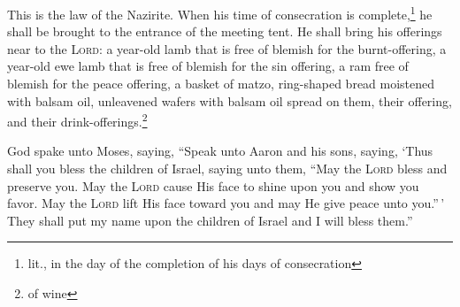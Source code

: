 \begin{enumerate*}[mode=unboxed]
     This is the law of the Nazirite. When his time of consecration is complete,\footnote{lit., in the day of the completion of his days of consecration} he shall be brought to the entrance of the meeting tent.%
     He shall bring his offerings near to the \textsc{Lord}: a year-old lamb that is free of blemish for the burnt-offering, a year-old ewe lamb that is free of blemish for the sin offering, a ram free of blemish for the peace offering,%
     a basket of matzo, ring-shaped bread moistened with balsam oil, unleavened wafers with balsam oil spread on them, their offering, and their drink-offerings.\footnote{of wine}%
    
     God spake unto Moses, saying,%
     ``Speak unto Aaron and his sons, saying, `Thus shall you bless the children of Israel, saying unto them,%
     ``May the \textsc{Lord} bless and preserve you.%
     May the \textsc{Lord} cause His face to shine upon you and show you favor.%
     May the \textsc{Lord} lift His face toward you and may He give peace unto you.''\,'%
     They shall put my name upon the children of Israel and I will bless them.''%
\end{enumerate*}
